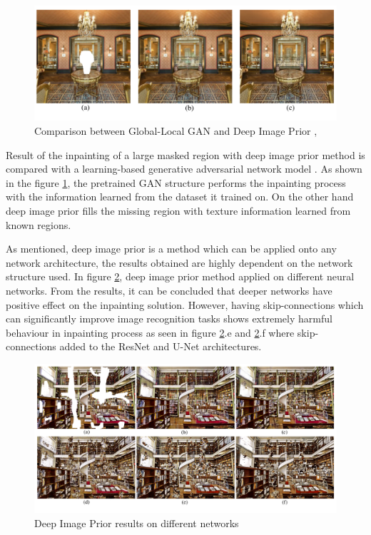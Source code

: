 \begin{figure}[h]
    \centering
    \includegraphics[width=13cm]{figures/chapter4/imprior3.png}
    \caption{Comparison between Global-Local GAN and Deep Image Prior \cite{Iizuka2017}, \cite{deep_image_prior}}
    \label{fig:prior_gan_comparison}
\end{figure}

Result of the inpainting of a large masked region with deep image prior method is compared with a learning-based generative adversarial network model \cite{Iizuka2017}. As shown in the figure \ref{fig:prior_gan_comparison}, the pretrained GAN structure performs the inpainting process with the information learned from the dataset it trained on. On the other hand deep image prior fills the missing region with texture information learned from known regions.

As mentioned, deep image prior is a method which can be applied onto any network architecture, the results obtained are highly dependent on the network structure used. In figure \ref{fig:prior_multimodels}, deep image prior method applied on different neural networks. From the results, it can be concluded that deeper networks have positive effect on the inpainting solution. However, having skip-connections which can significantly improve image recognition tasks shows extremely harmful behaviour in inpainting process as seen in figure \ref{fig:prior_multimodels}.e and \ref{fig:prior_multimodels}.f where skip-connections added to the ResNet \cite{deep_residual_recognition} and U-Net \cite{unet} architectures.

\begin{figure}[h]
    \centering
    \includegraphics[width=13cm]{figures/chapter4/imprior4.png}
    \caption{Deep Image Prior results on different networks \cite{deep_image_prior}}
    \label{fig:prior_multimodels}
\end{figure}

